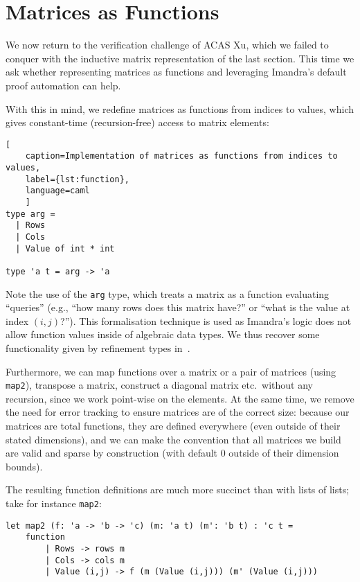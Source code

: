 \documentclass[runningheads]{llncs}
\begin{document}
\section{Matrices as Functions} \label{sec:function}

We now return to the verification challenge of ACAS Xu, which we failed to
conquer with the inductive matrix representation of the last section. This time
we ask whether representing matrices as functions and leveraging Imandra's
default proof automation can help.

With this in mind, we redefine matrices as functions from indices to values, which gives
constant-time (recursion-free) access to matrix elements:

\begin{lstlisting}[
	caption=Implementation of matrices as functions from indices to values,
	label={lst:function},
	language=caml
	]
type arg =
  | Rows
  | Cols
  | Value of int * int

type 'a t = arg -> 'a
\end{lstlisting}

Note the use of the \lstinline{arg} type, which treats a matrix as a function evaluating ``queries'' (e.g., ``how many rows does this matrix have?'' or ``what is the value at index $(i,j)$?''). This formalisation technique is used as Imandra's logic does not allow function values inside of algebraic data types. %
We thus recover some functionality given by refinement types in~\cite{KokkeKKAA20}.  

Furthermore, we can map functions over a matrix or a pair of matrices  (using \lstinline{map2}), transpose a
matrix, construct a diagonal matrix etc.\ without any recursion, since we work
point-wise on the elements. At the same time, we remove the need for error
tracking to ensure matrices are of the correct size: because our matrices are
total functions, they are defined everywhere (even outside of their stated
dimensions), and we can make the convention that all matrices we build are valid
and sparse by construction (with default 0 outside of their dimension bounds).

The resulting function definitions are much more succinct than with lists of lists; take for instance \lstinline{map2}:

\begin{lstlisting}
let map2 (f: 'a -> 'b -> 'c) (m: 'a t) (m': 'b t) : 'c t =
	function
		| Rows -> rows m
		| Cols -> cols m
		| Value (i,j) -> f (m (Value (i,j))) (m' (Value (i,j)))
\end{lstlisting}
\end{document}
